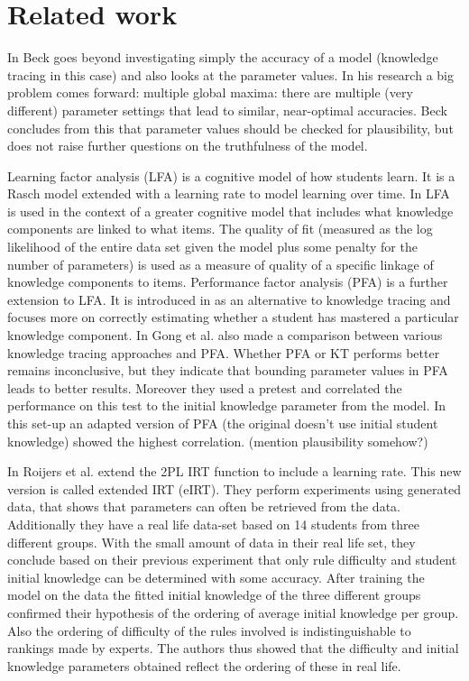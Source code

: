 \documentclass{article}
\begin{document}
\section{Related work}
In \cite{knowledgeproblem} Beck goes beyond investigating simply the accuracy of a model (knowledge tracing in this case) and also looks at the parameter values. In his research a big problem comes forward: multiple global maxima: there are multiple (very different) parameter settings that lead to similar, near-optimal accuracies. Beck concludes from this that parameter values should be checked for plausibility, but does not raise further questions on the truthfulness of the model.

Learning factor analysis (LFA) is a cognitive model of how students learn. It is a Rasch model extended with a learning rate to model learning over time. In \cite{lfa} LFA is used in the context of a greater cognitive model that includes what knowledge components are linked to what items. The quality of fit (measured as the log likelihood of the entire data set given the model plus some penalty for the number of parameters) is used as a measure of quality of a specific linkage of knowledge components to items.
Performance factor analysis (PFA) is a further extension to LFA. It is introduced in \cite{pfa} as an alternative to knowledge tracing and focuses more on correctly estimating whether a student has mastered a particular knowledge component.
In \cite{ktpfa} Gong et al. also made a comparison between various knowledge tracing approaches and PFA. Whether PFA or KT performs better remains inconclusive, but they indicate that bounding parameter values in PFA leads to better results. Moreover they used a pretest and correlated the performance on this test to the initial knowledge parameter from the model. In this set-up an adapted version of PFA (the original doesn't use initial student knowledge) showed the highest correlation. (mention plausibility somehow?)

In \cite{eirt} Roijers et al. extend the 2PL IRT function to include a learning rate. This new version is called extended IRT (eIRT). They perform experiments using generated data, that shows that parameters can often be retrieved from the data. Additionally they have a real life data-set based on 14 students from three different groups. With the small amount of data in their real life set, they conclude based on their previous experiment that only rule difficulty and student initial knowledge can be determined with some accuracy. After training the model on the data the fitted initial knowledge of the three different groups confirmed their hypothesis of the ordering of average initial knowledge per group. Also the ordering of difficulty of the rules involved is indistinguishable to rankings made by experts. The authors thus showed that the difficulty and initial knowledge parameters obtained reflect the ordering of these in real life.
\end{document}
